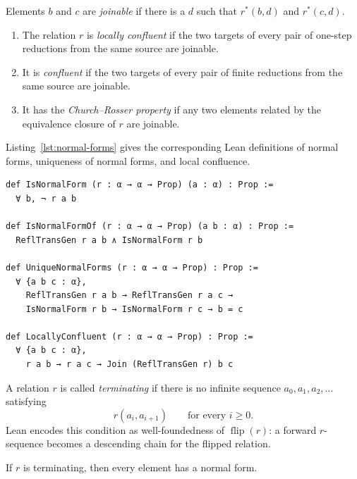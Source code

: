 \begin{definition}
\label{def:confluence-properties}
Elements $b$ and $c$ are \emph{joinable} if there is a $d$ such that
$r^*(b,d)$ and $r^*(c,d)$.
\begin{enumerate}[label=(\roman*),leftmargin=2em]
  \item The relation $r$ is \emph{locally confluent} if the two targets of
        every pair of one-step reductions from the same source are joinable.
  \item It is \emph{confluent} if the two targets of every pair of finite
        reductions from the same source are joinable.
  \item It has the \emph{Church--Rosser property} if any two elements related
        by the equivalence closure of $r$ are joinable.
\end{enumerate}
\end{definition}

Listing~\ref{lst:normal-forms} gives the corresponding Lean definitions of
normal forms, uniqueness of normal forms, and local confluence.

\begin{lstlisting}[style=lean,caption={Normal forms and local confluence for an abstract relation.},label={lst:normal-forms}]
def IsNormalForm (r : α → α → Prop) (a : α) : Prop :=
  ∀ b, ¬ r a b

def IsNormalFormOf (r : α → α → Prop) (a b : α) : Prop :=
  ReflTransGen r a b ∧ IsNormalForm r b

def UniqueNormalForms (r : α → α → Prop) : Prop :=
  ∀ {a b c : α},
    ReflTransGen r a b → ReflTransGen r a c →
    IsNormalForm r b → IsNormalForm r c → b = c

def LocallyConfluent (r : α → α → Prop) : Prop :=
  ∀ {a b c : α},
    r a b → r a c → Join (ReflTransGen r) b c
\end{lstlisting}

A relation $r$ is called \emph{terminating} if there is no infinite
sequence $a_0,a_1,a_2,\ldots$ satisfying
\[
  r(a_i,a_{i+1})
  \qquad\text{for every }i\geq0.
\]
Lean encodes this condition as well-foundedness of $\operatorname{flip}(r)$:
a forward $r$-sequence becomes a descending chain for the flipped relation.

\begin{theorem}\label{thm:normal-form-exists}
If $r$ is terminating, then every element has a normal form.
\end{theorem}


